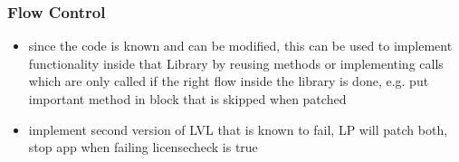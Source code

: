 \subsubsection{Flow Control} \label{subsection:counter-improve-tampering-flow}
\begin{itemize}
  \item since the code is known and can be modified, this can be used to implement functionality inside that Library by reusing methods or implementing
  calls which are only called if the right flow inside the library is done, e.g. put important method in block that is skipped when patched
  \item implement second version of LVL that is known to fail, LP will patch both, stop app when failing licensecheck is true
\end{itemize}
